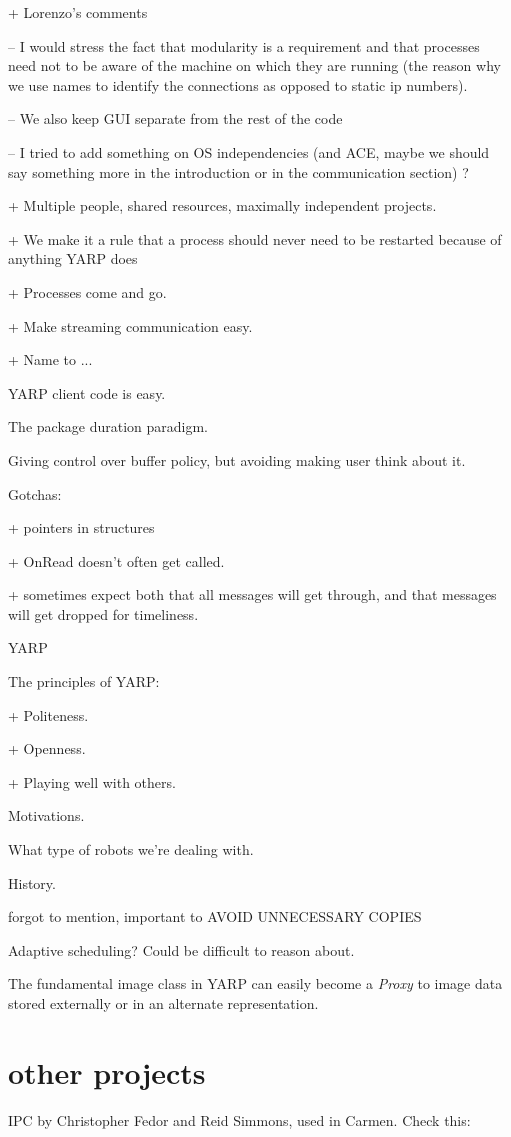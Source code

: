 
+ Lorenzo's comments

-- I would stress the fact that modularity is a requirement and that processes need not to be aware of the machine on which they are running (the reason why we use names to identify the connections as opposed to static ip numbers).

-- We also keep GUI separate from the rest of the code

-- I tried to add something on OS independencies (and ACE, maybe we should say something more in the introduction or in the communication section) ?

+ Multiple people, shared resources, maximally independent projects.

+ We make it a rule that a process should never need to be restarted
  because of anything YARP does

+ Processes come and go.

+ Make streaming communication easy.

+ Name to ...




YARP client code is easy.

The package duration paradigm.

Giving control over buffer policy, but avoiding making user
think about it.

Gotchas:

+ pointers in structures

+ OnRead doesn't often get called.

+ sometimes expect both that all messages will get through, and
  that messages will get dropped for timeliness.

YARP

The principles of YARP:

+ Politeness.

+ Openness.

+ Playing well with others.

Motivations.

What type of robots we're dealing with.

History.

forgot to mention, important to AVOID UNNECESSARY COPIES


Adaptive scheduling?  Could be difficult to reason about.


The fundamental image class in YARP can easily become a {\em Proxy}
to image data stored externally or in an alternate representation.



\section{other projects}

IPC by Christopher Fedor and Reid Simmons, used in Carmen.
Check this: \cite{roy03IROS}

